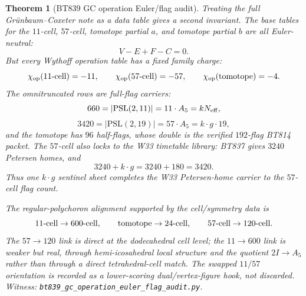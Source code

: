 \documentclass[11pt]{article}
\newtheorem{theorem}{Theorem}[section]
\begin{document}
\begin{theorem}[BT839 GC operation Euler/flag audit]
Treating the full Gr\"unbaum--Coxeter note as a data table gives a
second invariant.  The base tables for the $11$-cell, $57$-cell,
tomotope partial $a$, and tomotope partial $b$ are all Euler-neutral:
\[
V-E+F-C=0.
\]
But every Wythoff operation table has a fixed family charge:
\[
\chi_{\rm op}(11\hbox{-cell})=-11,\qquad
\chi_{\rm op}(57\hbox{-cell})=-57,\qquad
\chi_{\rm op}(\hbox{tomotope})=-4.
\]
The omnitruncated rows are full-flag carriers:
\[
660=|\mathrm{PSL}(2,11)|=11\cdot A_5=kN_{\rm eff},
\]
\[
3420=|\mathrm{PSL}(2,19)|=57\cdot A_5=k\cdot g\cdot19,
\]
and the tomotope has $96$ half-flags, whose double is the verified
$192$-flag BT814 packet.  The $57$-cell also locks to the W33 timetable
library: BT837 gives $3240$ Petersen homes, and
\[
3240+k\cdot g = 3240+180=3420.
\]
Thus one $k\cdot g$ sentinel sheet completes the W33 Petersen-home carrier
to the $57$-cell flag count.

The regular-polychoron alignment supported by the cell/symmetry data is
\[
11\hbox{-cell}\to600\hbox{-cell},\qquad
\hbox{tomotope}\to24\hbox{-cell},\qquad
57\hbox{-cell}\to120\hbox{-cell}.
\]
The $57\to120$ link is direct at the dodecahedral cell level; the
$11\to600$ link is weaker but real, through hemi-icosahedral local
structure and the quotient $2I\to A_5$ rather than through a direct
tetrahedral-cell match.  The swapped $11/57$ orientation is recorded as
a lower-scoring dual/vertex-figure hook, not discarded.
\emph{Witness: \texttt{bt839\_gc\_operation\_euler\_flag\_audit.py}.}
\end{theorem}
\end{document}
